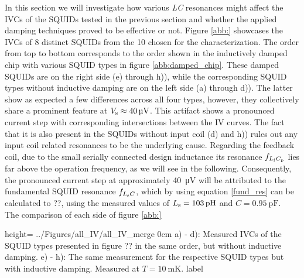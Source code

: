 In this section we will investigate how various \textit{LC} resonances might affect the IVCs of the SQUIDs tested in the previous section and whether the applied damping techniques proved to be effective or not. Figure \ref{abb:} showcases the IVCs of 8 distinct SQUIDs from the 10 chosen for the characterization. The order from top to bottom corresponds to the order shown in the inductively damped chip with various SQUID types in figure \ref{abb:damped_chip}. These damped SQUIDs are on the right side (e) through h)), while the corresponding SQUID types without inductive damping are on the left side (a) through d)). The latter show as expected a few differences across all four types, however, they collectively share a prominent feature at $V_{\rm s}\approx\qty{40}{\uV}$. This artifact shows a pronounced current step with corresponding intersections between the IV curves. The fact that it is also present in the SQUIDs without input coil (d) and h)) rules out any input coil related resonances to be the underlying cause. Regarding the feedback coil, due to the small serially connected design inductance its resonance $f_{L_{\rm f}C_{\rm p}}$ lies far above the operation frequency, as we will see in the following. Consequently, the pronounced current step at approximately \qty{40}{\uV} will be attributed to the fundamental SQUID resonance $f_{L_{\rm s}C}$, which by using equation \ref{fund_res} can be calculated to ??, using the measured values of $L_{\rm s}=\qty{103}{\pH}$ and $C=\qty{0.95}{\pF}$. \\
The comparison of each side of figure \ref{abb:}           

{height=\textheight}
{../Figures/all_IV/all_IV_merge}
{0cm}
{a) - d): Measured IVCs of the SQUID types presented in figure ?? in the same order, but without inductive damping. e) - h): The same measurement for the respective SQUID types but with inductive damping. Measured at $T=\qty{10}{\milli\kelvin}$.} 
{label}




